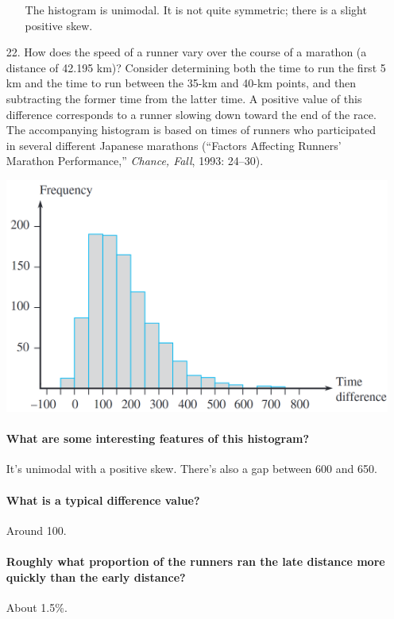 \documentclass[letterpaper,12pt]{article}
\begin{document}
\begin{enumerate}
\begin{enumerate}
        The histogram is unimodal. It is not quite symmetric; there is a slight positive skew.
    \end{enumerate}
  \item[22.]
    How does the speed of a runner vary over the course of a marathon (a distance of 42.195 km)? Consider determining both the time to run the first 5 km and the time to run between the 35-km and 40-km points, and then subtracting the former time from the latter time. A positive value of this difference corresponds to a runner slowing down toward the end of the race. The accompanying histogram is based on times of runners who participated in several different Japanese marathons (``Factors Affecting Runners’ Marathon Performance,'' \textit{Chance, Fall}, 1993: 24–30).
    \begin{center}
      \includegraphics[scale=0.3]{../resources/01_02_22_01.png}
    \end{center}
    \paragraph{What are some interesting features of this histogram?}
    It's unimodal with a positive skew. There's also a gap between 600 and 650.
    \vspace{-5pt}
    \paragraph{What is a typical difference value?}
    Around 100.
    \vspace{-5pt}
    \paragraph{Roughly what proportion of the runners ran the late distance more quickly than the early distance?}
    About 1.5\%.
\end{enumerate}
\end{document}
